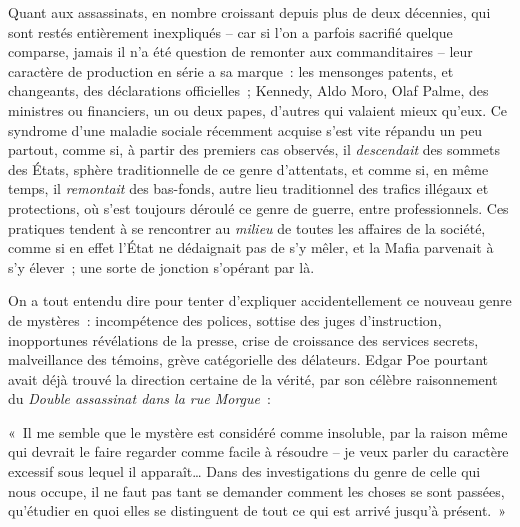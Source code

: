 \documentclass[french,twoside]{book} %
\def\bignobreak{\ifdim\lastskip<\bigskipamount
  \removelastskip\nopagebreak\bigskip\fi}
\newcommand{\labelblock}[1]{\bigbreak{\color{rubric}\noindent\textbf{#1}\par}\bignobreak}
\begin{document}
\labelblock{XXII}

\noindent Quant aux assassinats, en nombre croissant depuis plus de deux décennies, qui sont restés entièrement inexpliqués – car si l’on a parfois sacrifié quelque comparse, jamais il n’a été question de remonter aux commanditaires – leur caractère de production en série a sa marque : les mensonges patents, et changeants, des déclarations officielles ; Kennedy, Aldo Moro, Olaf Palme, des ministres ou financiers, un ou deux papes, d’autres qui valaient mieux qu’eux. Ce syndrome d’une maladie sociale récemment acquise s’est vite répandu un peu partout, comme si, à partir des premiers cas observés, il \emph{descendait} des sommets des États, sphère traditionnelle de ce genre d’attentats, et comme si, en même temps, il \emph{remontait} des bas-fonds, autre lieu traditionnel des trafics illégaux et protections, où s’est toujours déroulé ce genre de guerre, entre professionnels. Ces pratiques tendent à se rencontrer au \emph{milieu} de toutes les affaires de la société, comme si en effet l’État ne dédaignait pas de s’y mêler, et la Mafia parvenait à s’y élever ; une sorte de jonction s’opérant par là.\par
On a tout entendu dire pour tenter d’expliquer accidentellement ce nouveau genre de mystères : incompétence des polices, sottise des juges d’instruction, inopportunes révélations de la presse, crise de croissance des services secrets, malveillance des témoins, grève catégorielle des délateurs. Edgar Poe pourtant avait déjà trouvé la direction certaine de la vérité, par son célèbre raisonnement du \emph{Double assassinat dans la rue Morgue} :\par
« Il me semble que le mystère est considéré comme insoluble, par la raison même qui devrait le faire regarder comme facile à résoudre – je veux parler du caractère excessif sous lequel il apparaît… Dans des investigations du genre de celle qui nous occupe, il ne faut pas tant se demander comment les choses se sont passées, qu’étudier en quoi elles se distinguent de tout ce qui est arrivé jusqu’à présent. »\par

\labelblock{XXIII}
\end{document}
